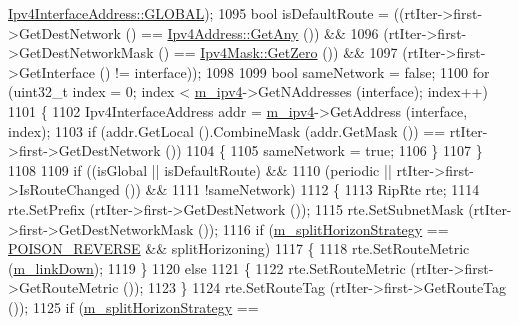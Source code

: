 \begin{DoxyCode}
      \hyperlink{classns3_1_1Ipv4InterfaceAddress_a329cea433e74f717c26c9e51c4fcd3d8ae144856017bcfb529872c91204d462b2}{Ipv4InterfaceAddress::GLOBAL});
1095               \textcolor{keywordtype}{bool} isDefaultRoute = ((rtIter->first->GetDestNetwork () == 
      \hyperlink{classns3_1_1Ipv4Address_a7a39b330c8e701183a411d5779fca1a4}{Ipv4Address::GetAny} ()) &&
1096                   (rtIter->first->GetDestNetworkMask () == \hyperlink{classns3_1_1Ipv4Mask_ac2dda492011ede8350008d753d278998}{Ipv4Mask::GetZero} ()) &&
1097                   (rtIter->first->GetInterface () != interface));
1098 
1099               \textcolor{keywordtype}{bool} sameNetwork = \textcolor{keyword}{false};
1100               \textcolor{keywordflow}{for} (uint32\_t index = 0; index < \hyperlink{classns3_1_1Rip_a6e2c0e74d2fa8643d223db26621dd7f1}{m\_ipv4}->GetNAddresses (interface); index++)
1101                 \{
1102                   Ipv4InterfaceAddress addr = \hyperlink{classns3_1_1Rip_a6e2c0e74d2fa8643d223db26621dd7f1}{m\_ipv4}->GetAddress (interface, index);
1103                   \textcolor{keywordflow}{if} (addr.GetLocal ().CombineMask (addr.GetMask ()) == rtIter->first->GetDestNetwork ())
1104                     \{
1105                       sameNetwork = \textcolor{keyword}{true};
1106                     \}
1107                 \}
1108 
1109               \textcolor{keywordflow}{if} ((isGlobal || isDefaultRoute) &&
1110                   (periodic || rtIter->first->IsRouteChanged ()) &&
1111                   !sameNetwork)
1112                 \{
1113                   RipRte rte;
1114                   rte.SetPrefix (rtIter->first->GetDestNetwork ());
1115                   rte.SetSubnetMask (rtIter->first->GetDestNetworkMask ());
1116                   \textcolor{keywordflow}{if} (\hyperlink{classns3_1_1Rip_a2053001529a46356e1f612dfde6b4faf}{m\_splitHorizonStrategy} == 
      \hyperlink{classns3_1_1Rip_aa65e80d926399a90bc81b30dfc9404a4ad6573915007f19810b223a280519eb86}{POISON\_REVERSE} && splitHorizoning)
1117                     \{
1118                       rte.SetRouteMetric (\hyperlink{classns3_1_1Rip_a3f37d4c5176e380482edf0be82d2fc18}{m\_linkDown});
1119                     \}
1120                   \textcolor{keywordflow}{else}
1121                     \{
1122                       rte.SetRouteMetric (rtIter->first->GetRouteMetric ());
1123                     \}
1124                   rte.SetRouteTag (rtIter->first->GetRouteTag ());
1125                   \textcolor{keywordflow}{if} (\hyperlink{classns3_1_1Rip_a2053001529a46356e1f612dfde6b4faf}{m\_splitHorizonStrategy} == 

\end{DoxyCode}
